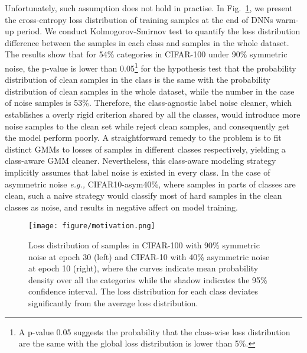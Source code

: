 \documentclass{article} \usepackage{iclr2023_conference,times}
\begin{document}
Unfortunately, such assumption does not hold  in practise. 
In Fig.~\ref{fig:motivation}, 
we present the cross-entropy loss distribution of training samples at the end of DNNs warm-up period. We conduct Kolmogorov-Smirnov test \citep{massey1951kolmogorov} to quantify the loss distribution difference between the samples in each class and samples in the whole dataset. The results show that for 54\%  categories in CIFAR-100 under 90\% symmetric noise, the p-value is lower than 0.05\footnote{A p-value  0.05 suggests the probability that the class-wise loss distribution are the same with the global loss distribution is lower than 5\%.} for the hypothesis test that the probability distribution of clean samples in the class is the same with the probability distribution of clean samples in the whole dataset, while the number in the case of noise samples is 53\%. Therefore, the class-agnostic label noise cleaner, which establishes a overly rigid criterion shared by all the classes, would introduce more noise samples to the clean set while reject clean samples, and consequently get the model perform poorly. A straightforward remedy to the problem is to fit distinct GMMs to losses of samples in different classes respectively, yielding a class-aware GMM cleaner. Nevertheless, this class-aware modeling strategy implicitly assumes that label noise is existed in every class. In the case of asymmetric noise \emph{e.g.,} CIFAR10-asym40\%, where samples in parts of classes are clean, such a naive strategy would classify most of hard samples in the clean classes as noise, and results in negative affect on model training.
\begin{figure}[t]
  \centering
  \texttt{[image: figure/motivation.png]}
  \caption{ Loss distribution of samples in CIFAR-100 with 90\% symmetric noise at epoch 30 (left)  and CIFAR-10 with 40\% asymmetric noise at epoch 10 (right), where the curves indicate mean probability density over all the categories while the shadow indicates the 95\% confidence interval. The loss distribution for each class deviates significantly from the average loss distribution.}
   \label{fig:motivation}
   \vspace{-1\baselineskip}
\end{figure}
\end{document}
